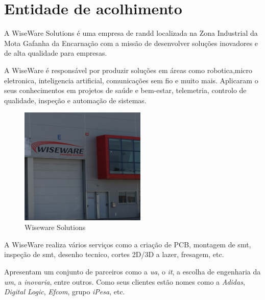 \chapter{Entidade de acolhimento}%
\label{chapter:entidade}

A WiseWare Solutions é uma empresa de \acs{randd} localizada na Zona Industrial da Mota Gafanha da Encarnação com a missão de desenvolver soluções inovadores e de alta qualidade para empresas.

A WiseWare é responsável por produzir soluções em áreas como robotica,micro eletronica, inteligencia artificial, comunicações sem fio e muito mais. Aplicaram o seus conhecimentos em projetos de saúde e bem-estar, telemetria, controlo de qualidade, inspeção e automação de sistemas.

\begin{figure}[h!]
	\centering
    \includegraphics[width=6cm]{figs/wiseware.png}
    \caption[WiseWare Solutions]{Wiseware Solutions}
    \label{fig:company}
\end{figure}

A WiseWare realiza vários serviços como a criação de PCB, montagem de \acs{smt}, inspeção de \acs{smt}, desenho tecnico, cortes 2D/3D a lazer, fresagem, etc.

Apresentam um conjunto de parceiros como a \textit{\ac{ua}}, o \textit{\ac{it}}, a escolha de engenharia da \textit{\ac{um}}, a \textit{inovaria}, entre outros. Como seus clientes estão nomes como a \textit{Adidas}, \textit{Digital Logic}, \textit{Efcom}, grupo \textit{iPesa}, etc.